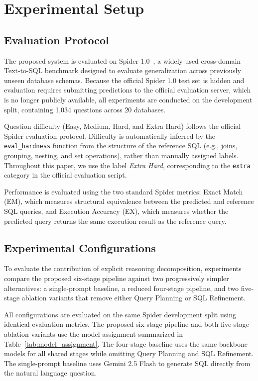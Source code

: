 \documentclass{svproc}
\begin{document}
\section{Experimental Setup}
\label{sec:exp}


\subsection{Evaluation Protocol}
\label{subsec:data}

The proposed system is evaluated on Spider 1.0~\cite{yu2018spider}, a widely used cross-domain Text-to-SQL benchmark designed to evaluate generalization across previously unseen database schemas. Because the official Spider 1.0 test set is hidden and evaluation requires submitting predictions to the official evaluation server, which is no longer publicly available, all experiments are conducted on the development split, containing 1,034 questions across 20 databases.

Question difficulty (Easy, Medium, Hard, and Extra Hard) follows the official Spider evaluation protocol. Difficulty is automatically inferred by the \texttt{eval\_hardness} function from the structure of the reference SQL (e.g., joins, grouping, nesting, and set operations), rather than manually assigned labels. Throughout this paper, we use the label \textit{Extra Hard}, corresponding to the \texttt{extra} category in the official evaluation script.

Performance is evaluated using the two standard Spider metrics: Exact Match (EM), which measures structural equivalence between the predicted and reference SQL queries, and Execution Accuracy (EX), which measures whether the predicted query returns the same execution result as the reference query.

\subsection{Experimental Configurations}
\label{subsec:configs}

To evaluate the contribution of explicit reasoning decomposition, experiments compare the proposed six-stage pipeline against two progressively simpler alternatives: a single-prompt baseline, a reduced four-stage pipeline, and two five-stage ablation variants that remove either Query Planning or SQL Refinement.

All configurations are evaluated on the same Spider development split using identical evaluation metrics. The proposed six-stage pipeline and both five-stage ablation variants use the model assignment summarized in Table~\ref{tab:model_assignment}. The four-stage baseline uses the same backbone models for all shared stages while omitting Query Planning and SQL Refinement. The single-prompt baseline uses Gemini 2.5 Flash to generate SQL directly from the natural language question.
\end{document}
